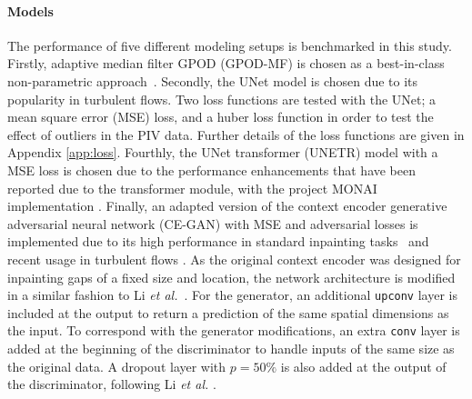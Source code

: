 \documentclass{article}
\begin{document}
\paragraph{Models}
The performance of five different modeling setups is benchmarked in this study. Firstly, adaptive median filter GPOD (GPOD-MF) is chosen as a best-in-class non-parametric approach~\cite{saini2016development}. Secondly, the UNet model \cite{ronneberger2015u} is chosen due to its popularity in turbulent flows. Two loss functions are tested with the UNet; a mean square error (MSE) loss, and a huber loss function in order to test the effect of outliers in the PIV data. Further details of the loss functions are given in Appendix \ref{app:loss}. Fourthly, the UNet transformer (UNETR) model \cite{hatamizadeh2022unetr} with a MSE loss is chosen due to the performance enhancements that have been reported due to the transformer module, with the project MONAI implementation \cite{cardoso2022monai}. Finally, an adapted version of the context encoder generative adversarial neural network (CE-GAN) \cite{pathak2016context} with MSE and adversarial losses is implemented due to its high performance in standard inpainting tasks~\cite{elharrouss2020image,liu2021pd} and recent usage in turbulent flows \cite{li2023multi,buzzicotti2021reconstruction}. As the original context encoder was designed for inpainting gaps of a fixed size and location, the network architecture is modified in a similar fashion to Li \textit{et al.}~\cite{li2023multi}. For the generator, an additional \texttt{upconv} layer is included at the output to return a prediction of the same spatial dimensions as the input. To correspond with the generator modifications, an extra \texttt{conv} layer is added at the beginning of the discriminator to handle inputs of the same size as the original data. A dropout layer with $p=50\%$ is also added at the output of the discriminator, following Li \textit{et al.} \cite{li2023multi}.
\end{document}
